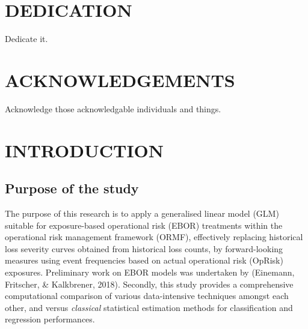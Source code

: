 \documentclass{DissertateUSU}
\begin{document}
\chapter*{DEDICATION}

Dedicate it.

\newpage
{}
\fancyhead[R]{\thepage}
\fancyfoot[C]{}
\chapter*{ACKNOWLEDGEMENTS}

Acknowledge those acknowledgable individuals and things.

\newpage
{}
\fancyhead[R]{\thepage}
\fancyfoot[C]{}
\tableofcontents

\newpage
{}
\fancyhead[R]{\thepage}
\fancyfoot[C]{}
\listoftables

\newpage
{}
\fancyhead[R]{\thepage}
\fancyfoot[C]{}
\listoffigures

\newpage
{}

\newpage
{}
\fancyhead[R]{\thepage}
\fancyfoot[C]{}

\chapter{INTRODUCTION}
\label{INTRODUCTION}

\doublespacing

\section{Purpose of the study}
\label{sec:Purpose of the study}

The purpose of this research is to apply a generalised linear model
(GLM) suitable for exposure-based operational risk (EBOR) treatments
within the operational risk management framework (ORMF), effectively
replacing historical loss severity curves obtained from historical loss
counts, by forward-looking measures using event frequencies based on
actual operational risk (OpRisk) exposures. Preliminary work on EBOR
models was undertaken by (Einemann, Fritscher, \& Kalkbrener, 2018).
Secondly, this study provides a comprehensive computational comparison
of various data-intensive techniques amongst each other, and versus
\emph{classical} statistical estimation methods for classification and
regression performances.\medskip
\end{document}
